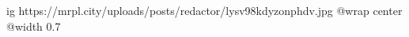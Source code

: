  
 
 
 
 

\ifcmt
  ig https://mrpl.city/uploads/posts/redactor/lysv98kdyzonphdv.jpg
  @wrap center
  @width 0.7
\fi
